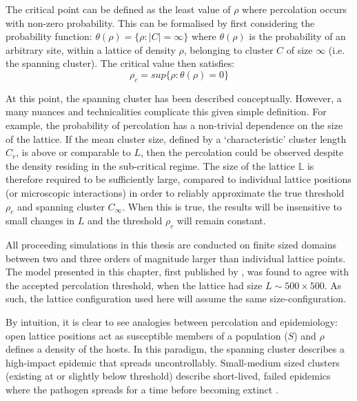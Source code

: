 The critical point can be defined as the least value of $\rho$ where percolation occurs with non-zero probability. %
This can be formalised by first considering the probability function: $\theta (\rho)= \lbrace \rho:|C|=\infty\rbrace$ where $\theta(\rho)$ is the probability of an arbitrary site, %
within a lattice of density $\rho$, belonging to cluster $C$ of size $\infty$ (i.e. the spanning cluster). %
The critical value then satisfies: %
\begin{equation}
\label{eq:critical_threshold_1d}
    \rho _{c}=sup \lbrace \rho : \theta (\rho ) = 0 \rbrace
\end{equation}

At this point, the spanning cluster has been described conceptually. %
However, a  many nuances and technicalities complicate this given simple definition. %
For example, the probability of percolation has a non-trivial dependence on the size of the lattice. %
If the mean cluster size, defined by a `characteristic' cluster length $C_r$, is above or comparable to $L$, then the percolation could be observed despite the density residing in the sub-critical regime. %
The size of the lattice $\mathbb{L}$ is therefore required to be sufficiently large, compared to individual lattice positions (or microscopic interactions) in order to reliably approximate the true threshold $\rho_c$ and spanning cluster $C_{\infty}$. %
When this is true, the results will be insensitive to small changes in $L$ and the threshold $\rho_c$ will remain constant. %

All proceeding simulations in this thesis are conducted on finite sized domains between two and three orders of magnitude larger than individual lattice points. %
The model presented in this chapter, first published by \cite{OROZCOFUENTES201912}, was found to agree with the accepted percolation threshold, when the lattice had size $L \sim 500\times500$. %
As such, the lattice configuration used here will assume the same size-configuration. %

By intuition, it is clear to see analogies between percolation and epidemiology: open lattice positions act as susceptible members of a population ($S$) and $\rho$ defines a density of the hosts. %
In this paradigm, the spanning cluster describes a high-impact epidemic that spreads uncontrollably. %
Small-medium sized clusters (existing at or slightly below threshold) describe short-lived, failed epidemics where the pathogen spreads for a time before becoming extinct \cite{gilligan2008epidemiological}. %


